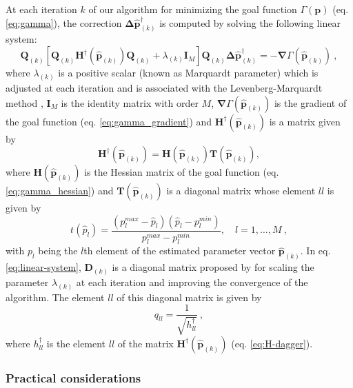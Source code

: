 At each iteration $k$ of our algorithm for minimizing the 
goal function $\Gamma(\mathbf{p})$ (eq. \ref{eq:gamma}), 
the correction $\boldsymbol{\Delta}\hat{\mathbf{p}}^{\dagger}_{(k)}$ is 
computed by solving the following linear system:
\begin{equation}\label{eq:linear-system}
\mathbf{Q}_{(k)} \left[\mathbf{Q}_{(k)} \mathbf{H}^{\dagger}(\hat{\mathbf{p}}_{(k)}) \mathbf{Q}_{(k)} + \lambda_{(k)} \mathbf{I}_{M} \right] \mathbf{Q}_{(k)} \boldsymbol{\Delta} \hat{\mathbf{p}}^{\dagger}_{(k)} = -\boldsymbol{\nabla}\Gamma(\hat{\mathbf{p}}_{(k)}) \: ,
\end{equation}
where $\lambda_{(k)}$ is a positive scalar (known as Marquardt parameter) which is adjusted at each iteration and 
is associated with the Levenberg-Marquardt method \cite[e.g., ][ p. 240]{silva-2001,aster-etal2019},
$\mathbf{I}_{M}$ is the identity matrix with order $M$, $\boldsymbol{\nabla}\Gamma(\hat{\mathbf{p}}_{(k)})$
is the gradient of the 
goal function (eq. \ref{eq:gamma_gradient}) and $\mathbf{H}^{\dagger}(\hat{\mathbf{p}}_{(k)})$ is a matrix given by
\begin{equation}\label{eq:H-dagger}
\mathbf{H}^{\dagger}(\hat{\mathbf{p}}_{(k)}) = \mathbf{H}(\hat{\mathbf{p}}_{(k)})\mathbf{T}(\hat{\mathbf{p}}_{(k)}),
\end{equation}
where $\mathbf{H}(\hat{\mathbf{p}}_{(k)})$ is the Hessian matrix of the goal function (eq. \ref{eq:gamma_hessian}) and $\mathbf{T}(\hat{\mathbf{p}}_{(k)})$ is a diagonal matrix whose element $ll$ is given by
\begin{equation}\label{eq:inequality-diag}
t(\hat{p}_{l}) = \frac{(p_{l}^{max} - \hat{p}_{l})(\hat{p}_{l} - p_{l}^{min})}{p_{l}^{max} - p_{l}^{min}}, \quad l = 1, \dots, M \: ,
\end{equation}
with $p_{l}$ being the $l$th element of the estimated parameter vector $\hat{\mathbf{p}}_{(k)}$. In eq. \ref{eq:linear-system}, $\mathbf{D}_{(k)}$ is a diagonal matrix proposed by  \cite{marquardt_algorithm_1963} for scaling the parameter $\lambda_{(k)}$ at each iteration and improving the convergence of the algorithm. The element $ll$ of this diagonal matrix is given by
\begin{equation}\label{eq:Q-matrix}
q_{ll} = \frac{1}{\sqrt{h^{\dagger}_{ll}}} \: ,
\end{equation}
where $h^{\dagger}_{ll}$ is the element $ll$ of the matrix $\mathbf{H}^{\dagger}(\hat{\mathbf{p}}_{(k)})$ (eq. \ref{eq:H-dagger}). 


\subsubsection{Practical considerations}

